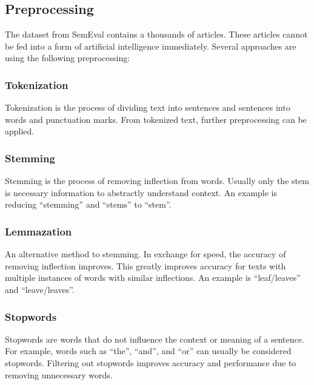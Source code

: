 \subsection{Preprocessing}
The dataset from SemEval contains a thousands of articles. These articles cannot be fed into a form of artificial intelligence immediately. Several approaches are using the following preprocessing:

\subsubsection{Tokenization}
Tokenization is the process of dividing text into sentences and sentences into words and punctuation marks.
From tokenized text, further preprocessing can be applied.

\subsubsection{Stemming}
Stemming is the process of removing inflection from words.
Usually only the stem is necessary information to abstractly understand context.
An example is reducing ``stemming'' and ``stems'' to ``stem''.

\subsubsection{Lemmazation}
An alternative method to stemming.
In exchange for speed, the accuracy of removing inflection improves.
This greatly improves accuracy for texts with multiple instances of words with similar inflections.
An example is ``leaf/leaves'' and ``leave/leaves''.

\subsubsection{Stopwords}
Stopwords are words that do not influence the context or meaning of a sentence.
For example, words such as ``the'', ``and'', and ``or'' can usually be considered stopwords.
Filtering out stopwords improves accuracy and performance due to removing unnecessary words.




